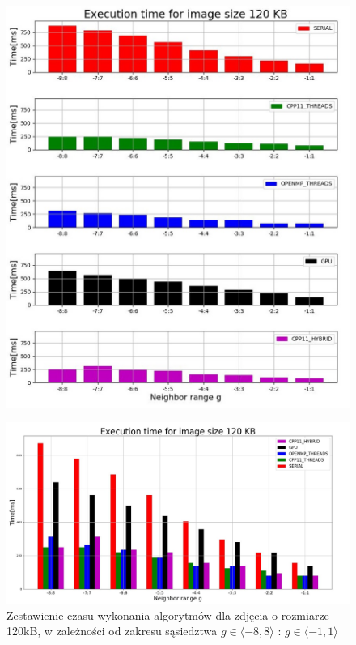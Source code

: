 \documentclass[document.tex]{subfiles}
\begin{document}
\clearpage
\begin{figure}[h]
\includegraphics[scale=0.6]{imgs/plot3_pc.jpg}
\caption*{}
\label{fig:results_pc_hybrid}
\end{figure}
\clearpage
\begin{figure}[h]
\includegraphics[scale=0.35]{imgs/plot5_pc.jpg}
\caption{Zestawienie czasu wykonania algorytmów dla zdjęcia o rozmiarze 120kB, 
        w zależności od zakresu sąsiedztwa $g\in \langle -8, 8 \rangle$ : $g\in \langle -1, 1 \rangle$ }
\label{fig:results_pc_hybrid}
\end{figure}
\end{document}
